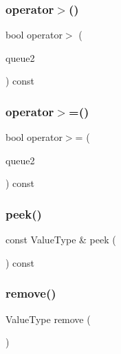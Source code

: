 \mbox{\label{classQueue_afb42a4f29f0857da53e102eb8f77eea6}} 
\subsubsection{\texorpdfstring{operator$>$()}{operator>()}}
{\footnotesize\ttfamily bool operator$>$ (\begin{DoxyParamCaption}\item[{const \mbox{\hyperlink{classQueue}{Queue}}$<$ Value\+Type $>$ \&}]{queue2 }\end{DoxyParamCaption}) const}

\mbox{\label{classQueue_ad18096c65e1e4666a4103b559d2c2acd}} 
\subsubsection{\texorpdfstring{operator$>$=()}{operator>=()}}
{\footnotesize\ttfamily bool operator$>$= (\begin{DoxyParamCaption}\item[{const \mbox{\hyperlink{classQueue}{Queue}}$<$ Value\+Type $>$ \&}]{queue2 }\end{DoxyParamCaption}) const}

\mbox{\label{classQueue_a74501ededf728c31068dd28a70a8a1f2}} 
\subsubsection{\texorpdfstring{peek()}{peek()}}
{\footnotesize\ttfamily const Value\+Type \& peek (\begin{DoxyParamCaption}{ }\end{DoxyParamCaption}) const}

\mbox{\label{classQueue_a025ec97fa5b04552f5ad0902c1f02ac1}} 
\subsubsection{\texorpdfstring{remove()}{remove()}}
{\footnotesize\ttfamily Value\+Type remove (\begin{DoxyParamCaption}{ }\end{DoxyParamCaption})}

